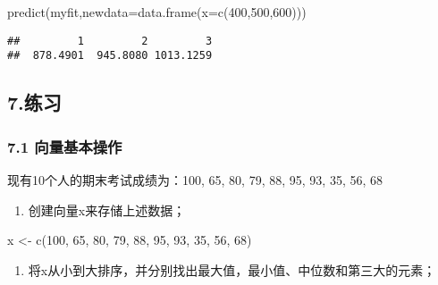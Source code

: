 \documentclass[
]{article}
\newenvironment{Shaded}{\begin{snugshade}}{\end{snugshade}}
\newcommand{\AttributeTok}[1]{\textcolor[rgb]{0.77,0.63,0.00}{#1}}
\newcommand{\DecValTok}[1]{\textcolor[rgb]{0.00,0.00,0.81}{#1}}
\newcommand{\FunctionTok}[1]{\textcolor[rgb]{0.00,0.00,0.00}{#1}}
\newcommand{\NormalTok}[1]{#1}
\newcommand{\OtherTok}[1]{\textcolor[rgb]{0.56,0.35,0.01}{#1}}
\providecommand{\tightlist}{%
  \setlength{\itemsep}{0pt}\setlength{\parskip}{0pt}}
\begin{document}
\begin{Shaded}
\begin{Highlighting}[]
\FunctionTok{predict}\NormalTok{(myfit,}\AttributeTok{newdata=}\FunctionTok{data.frame}\NormalTok{(}\AttributeTok{x=}\FunctionTok{c}\NormalTok{(}\DecValTok{400}\NormalTok{,}\DecValTok{500}\NormalTok{,}\DecValTok{600}\NormalTok{)))}
\end{Highlighting}
\end{Shaded}

\begin{verbatim}
##         1         2         3 
##  878.4901  945.8080 1013.1259
\end{verbatim}

\hypertarget{ux7ec3ux4e60}{%
\subsection{7.练习}\label{ux7ec3ux4e60}}

\hypertarget{ux5411ux91cfux57faux672cux64cdux4f5c}{%
\subsubsection{7.1
向量基本操作}\label{ux5411ux91cfux57faux672cux64cdux4f5c}}

现有10个人的期末考试成绩为：100, 65, 80, 79, 88, 95, 93, 35, 56, 68

\begin{enumerate}
\def\labelenumi{\arabic{enumi}.}
\tightlist
\item
  创建向量x来存储上述数据；
\end{enumerate}

\begin{Shaded}
\begin{Highlighting}[]
\NormalTok{x }\OtherTok{\textless{}{-}} \FunctionTok{c}\NormalTok{(}\DecValTok{100}\NormalTok{, }\DecValTok{65}\NormalTok{, }\DecValTok{80}\NormalTok{, }\DecValTok{79}\NormalTok{, }\DecValTok{88}\NormalTok{, }\DecValTok{95}\NormalTok{, }\DecValTok{93}\NormalTok{, }\DecValTok{35}\NormalTok{, }\DecValTok{56}\NormalTok{, }\DecValTok{68}\NormalTok{)}
\end{Highlighting}
\end{Shaded}

\begin{enumerate}
\def\labelenumi{\arabic{enumi}.}
\setcounter{enumi}{1}
\tightlist
\item
  将x从小到大排序，并分别找出最大值，最小值、中位数和第三大的元素；
\end{enumerate}
\end{document}
